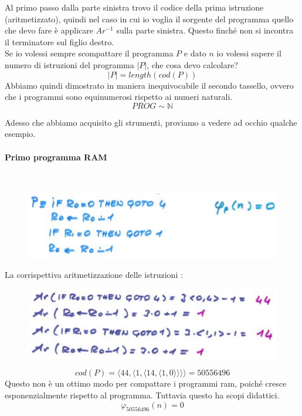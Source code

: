 \documentclass{article}
\begin{document}
Al primo passo dalla parte sinistra trovo il codice della prima istruzione
(aritmetizzato), quindi nel caso in cui io voglia il sorgente del programma
quello che devo fare è applicare $Ar^{-1}$ sulla parte sinistra. Questo finché
non si incontra il terminatore sul figlio destro.\\Se io volessi sempre
scompattare il programma $P$ e dato $n$ io volessi sapere il numero di istruzioni
del programma $|P|$, che cosa devo calcolare?
$$|P|=length(cod(P))$$
Abbiamo quindi dimostrato in maniera inequivocabile il secondo tassello, ovvero
che i programmi sono equinumerosi rispetto ai numeri naturali.
$$PROG\sim\mathbb{N}$$

Adesso che abbiamo acquisito gli strumenti, proviamo a vedere ad occhio qualche
esempio.

\paragraph{Primo programma RAM}\mbox{}\\
\begin{figure}[H]
    \centering
    \includegraphics[scale=0.5]{images/prog_1.png}
\end{figure}

La corrispettiva aritmetizzazione delle istruzioni :

\begin{figure}[H]
    \centering
    \includegraphics[scale=0.5]{images/cod_1.png}
\end{figure}
$$cod(P)=\langle 44,\langle 1,\langle 14,\langle 1,0\rangle\rangle\rangle\rangle=50556496$$
Questo non è un ottimo modo per compattare i programmi ram, poiché cresce esponenzialmente
rispetto al programma. Tuttavia questo ha scopi didattici.
$$\varphi_{50556496}(n)=0$$
\end{document}
